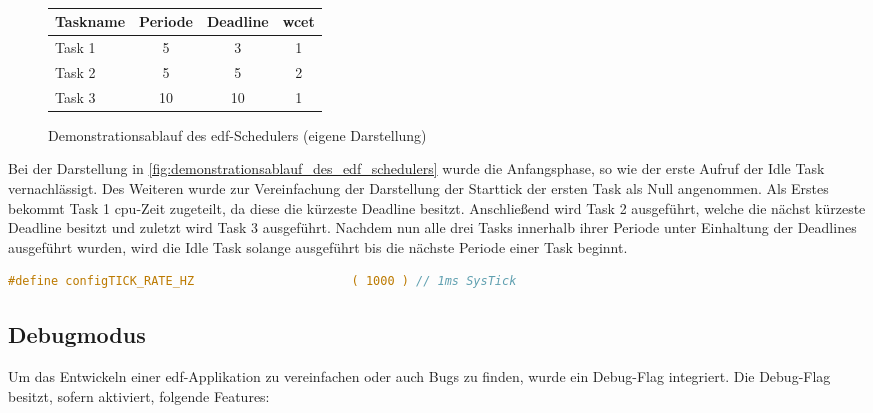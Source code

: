 \documentclass[../EDF Master Thesis.tex]{subfiles}
\begin{document}
\begin{figure}[ht!]
\begin{tikzpicture}
        \end{tikzpicture}\\
        \vspace {1cm}
        \begin{tabular}{l|c|c|c}
            Taskname & Periode & Deadline & \ac{wcet} \\
            \hline
            Task 1 & 5 & 3 & 1 \\
            Task 2 & 5 & 5 & 2 \\
            Task 3 & 10 & 10 & 1 
        \end{tabular}
        \caption[Demonstrationsablauf des \ac{edf}-Schedulers]{Demonstrationsablauf des \ac{edf}-Schedulers (eigene Darstellung)}
        \label{fig:demonstrationsablauf_des_edf_schedulers}
    \end{figure}

    Bei der Darstellung in \autoref{fig:demonstrationsablauf_des_edf_schedulers} wurde die Anfangsphase, so wie der erste Aufruf der Idle Task vernachlässigt.
    Des Weiteren wurde zur Vereinfachung der Darstellung der Starttick der ersten Task als Null angenommen.
    Als Erstes bekommt Task 1 \ac{cpu}-Zeit zugeteilt, da diese die kürzeste Deadline besitzt.
    Anschließend wird Task 2 ausgeführt, welche die nächst kürzeste Deadline besitzt und zuletzt wird Task 3 ausgeführt.
    Nachdem nun alle drei Tasks innerhalb ihrer Periode unter Einhaltung der Deadlines ausgeführt wurden, wird die Idle Task solange ausgeführt bis die nächste Periode einer Task beginnt.

\begin{lstlisting}[language=C, caption=FreeRTOS SysTick Deklaration, label=code:freertos_sys_tick_deklaration]
    #define configTICK_RATE_HZ						( 1000 ) // 1ms SysTick
\end{lstlisting}

\subsection{Debugmodus} \label{section:debug_mode}

    Um das Entwickeln einer \ac{edf}-Applikation zu vereinfachen oder auch Bugs zu finden, wurde ein Debug-Flag integriert.
    Die Debug-Flag besitzt, sofern aktiviert, folgende Features:
\end{document}
